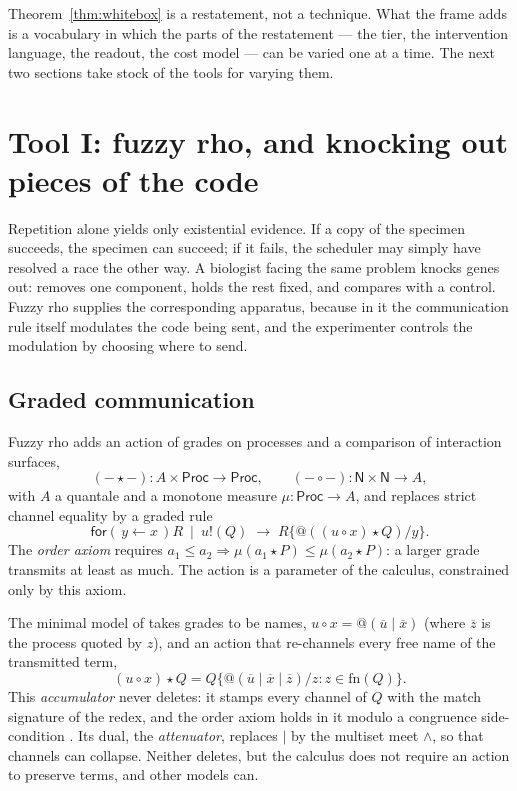 \documentclass[11pt]{article}
\makeatletter
\theoremstyle{definition}
\theoremstyle{plain}
\theoremstyle{remark}
\newcommand{\quo}[1]{@#1}
\newcommand{\dr}[1]{\overline{#1}}
\newcommand{\inp}[3]{\mathsf{for}(\,#1 \leftarrow #2\,)#3}
\newcommand{\out}[2]{#1!(#2)}
\newcommand{\fn}{\mathrm{fn}}
\newcommand{\act}{\mathbin{\star}}
\newcommand{\cmp}{\mathbin{\circ}}
\newcommand{\Proc}{\mathsf{Proc}}
\newcommand{\Names}{\mathsf{N}}
\makeatother
\begin{document}
Theorem~\ref{thm:whitebox} is a restatement, not a technique. What the
frame adds is a vocabulary in which the parts of the restatement --- the
tier, the intervention language, the readout, the cost model --- can be
varied one at a time. The next two sections take stock of the tools for
varying them.
\section{Tool I: fuzzy rho, and knocking out pieces of the code}\label{sec:fuzzy}

Repetition alone yields only existential evidence. If a copy of the
specimen succeeds, the specimen can succeed; if it fails, the scheduler
may simply have resolved a race the other way. A biologist facing the same
problem knocks genes out: removes one component, holds the rest fixed, and
compares with a control. Fuzzy rho supplies the corresponding apparatus,
because in it the communication rule itself modulates the code being
sent, and the experimenter controls the modulation by choosing where to
send.

\subsection{Graded communication}

Fuzzy rho \cite{FuzzyRho} adds an action of grades on processes and a
comparison of interaction surfaces,
\[
(-\act-)\colon A\times\Proc\to\Proc, \qquad
(-\cmp-)\colon \Names\times\Names\to A,
\]
with $A$ a quantale and a monotone measure $\mu : \Proc \to A$, and
replaces strict channel equality by a graded rule
\[
\inp{y}{x}{R} \ \mid\ \out{u}{Q} \;\to\; R\{\quo{((u \cmp x) \act Q)}/y\}.
\]
The \emph{order axiom} requires $a_1 \le a_2 \Rightarrow \mu(a_1 \act P)
\le \mu(a_2 \act P)$: a larger grade transmits at least as much. The
action is a parameter of the calculus, constrained only by this axiom.

The minimal model of \cite{FuzzyRho} takes grades to be names, $u \cmp x =
\quo{(\dr u \mid \dr x)}$ (where $\dr z$ is the process quoted by $z$),
and an action that re-channels every free name of the transmitted term,
\[
(u \cmp x) \act Q = Q\{\quo{(\dr{u} \mid \dr{x} \mid \dr{z})}/z : z \in \fn(Q)\}.
\]
This \emph{accumulator} never deletes: it stamps every channel of $Q$ with
the match signature of the redex, and the order axiom holds in it modulo a
congruence side-condition \cite{FuzzyRho}. Its dual, the
\emph{attenuator}, replaces $\mid$ by the multiset meet $\wedge$, so that
channels can collapse. Neither deletes, but the calculus does not require
an action to preserve terms, and other models can.
\end{document}
